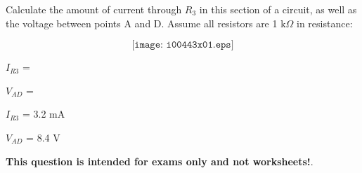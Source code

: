 

Calculate the amount of current through $R_3$ in this section of a circuit, as well as the voltage between points A and D.  Assume all resistors are 1 k$\Omega$ in resistance:

$$\texttt{[image: i00443x01.eps]}$$

$I_{R3}$ = 

\vskip 10pt

$V_{AD}$ = 

\vskip 10pt







$I_{R3}$ = 3.2 mA

\vskip 10pt

$V_{AD}$ = 8.4 V







{\bf This question is intended for exams only and not worksheets!}.


